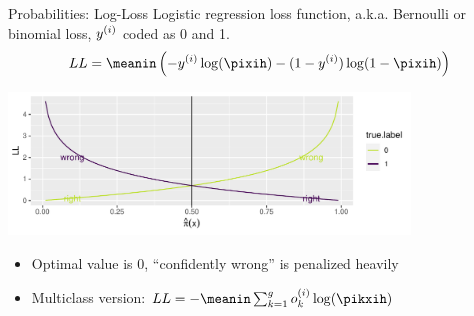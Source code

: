 \begin{vbframe}{Probabilities: Log-Loss}
Logistic regression loss function, a.k.a. Bernoulli or binomial loss, $y^{(i)}$ coded as 0 and 1.
\[
LL = \meanin \left( - \yi \log(\pixih) - (1-\yi) \log(1-\pixih) \right)
\]
\begin{knitrout}\scriptsize
{}\color{fgcolor}

{\centering \includegraphics[width=0.8\textwidth]{figure/eval_mclass_2}  

}



\end{knitrout}
\begin{itemize}
  \item Optimal value is 0, \enquote{confidently wrong} is penalized heavily
  \item Multiclass version: $ LL = - \meanin \sumkg o_k^{(i)} \log(\pikxih) $
\end{itemize}
\end{vbframe}


\endlecture


